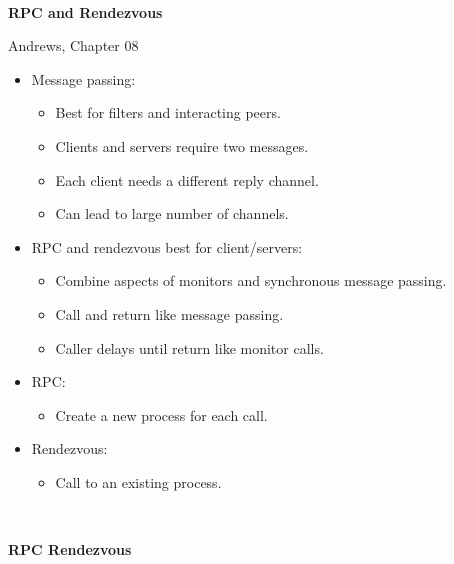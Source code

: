 \documentclass{article}
\newcommand{\bi}{\begin{itemize}}
\newcommand{\ii}{\item}
\newcommand{\ei}{\end{itemize}}
\newcommand{\ti}[1]{
\newpage
\mbox{~}

\vspace{1.25in}
\centerline{\bf #1}
}
\begin{document}
\huge\sf

\ti{RPC and Rendezvous}
\centerline{Andrews, Chapter 08}
\bi
\ii Message passing:
\bi
  \ii Best for filters and interacting peers.
  \ii Clients and servers require two messages.
  \ii Each client needs a different reply channel.
  \ii Can lead to large number of channels.
\ei
\ii RPC and rendezvous best for client/servers:
\bi
\ii Combine aspects of monitors and synchronous message passing.
\ii Call and return like message passing.
\ii Caller delays until return like monitor calls.
\ei
\ii RPC:
\bi
\ii Create a new process for each call.
\ei
\ii Rendezvous:
\bi
\ii Call to an existing process.
\ei
\ei

\ti{RPC \hspace{5in} Rendezvous}

\vspace{1cm}
\end{document}
